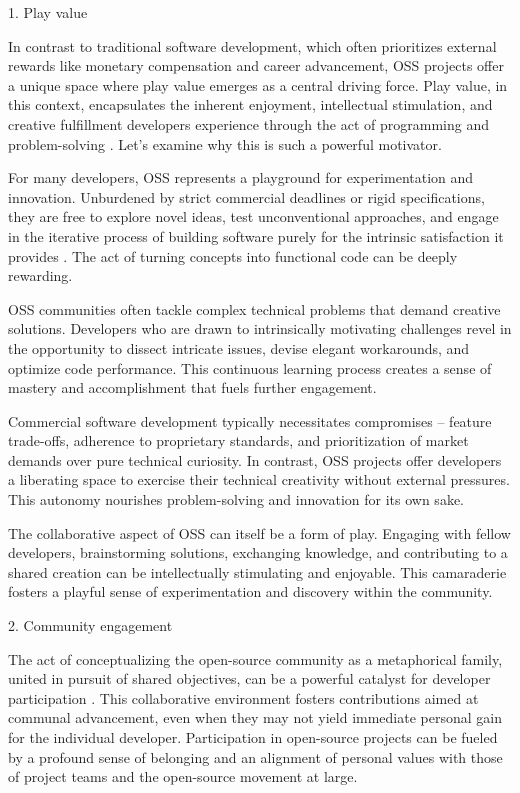 1. Play value

In contrast to traditional software development, which often prioritizes external rewards like monetary compensation and career advancement, OSS projects offer a unique space where play value emerges as a central driving force. Play value, in this context, encapsulates the inherent enjoyment, intellectual stimulation, and creative fulfillment developers experience through the act of programming and problem-solving \parencite{05bitzer2007intrinsic, 06ye2003toward, 08zhang2024paid, 09lakhani2005hackers, 11gerosa2021shifting, 12choi2015characteristics,13li2012leadership,16ke2008motivations,17alexander2002working, 18oreg2008exploring}. Let's examine why this is such a powerful motivator.

For many developers, OSS represents a playground for experimentation and innovation. Unburdened by strict commercial deadlines or rigid specifications, they are free to explore novel ideas, test unconventional approaches, and engage in the iterative process of building software purely for the intrinsic satisfaction it provides .  The act of turning concepts into functional code can be deeply rewarding.

OSS communities often tackle complex technical problems that demand creative solutions.  Developers who are drawn to intrinsically motivating challenges revel in the opportunity to dissect intricate issues, devise elegant workarounds, and optimize code performance. This continuous learning process creates a sense of mastery and accomplishment that fuels further engagement.

Commercial software development typically necessitates compromises – feature trade-offs, adherence to proprietary standards, and prioritization of market demands over pure technical curiosity. In contrast, OSS projects offer developers a liberating space to exercise their technical creativity without external pressures. This autonomy nourishes problem-solving and innovation for its own sake.

The collaborative aspect of OSS can itself be a form of play.  Engaging with fellow developers, brainstorming solutions, exchanging knowledge, and contributing to a shared creation can be intellectually stimulating and enjoyable. This camaraderie fosters a playful sense of experimentation and discovery within the community.


2. Community engagement

The act of conceptualizing the open-source community as a metaphorical family, united in pursuit of shared objectives, can be a powerful catalyst for developer participation \parencite{05bitzer2007intrinsic,07zhao2024openrank, 08zhang2024paid, 09lakhani2005hackers, 13li2012leadership, 16ke2008motivations, 17alexander2002working}. This collaborative environment fosters contributions aimed at communal advancement, even when they may not yield immediate personal gain for the individual developer. Participation in open-source projects can be fueled by a profound sense of belonging and an alignment of personal values with those of project teams and the open-source movement at large.

